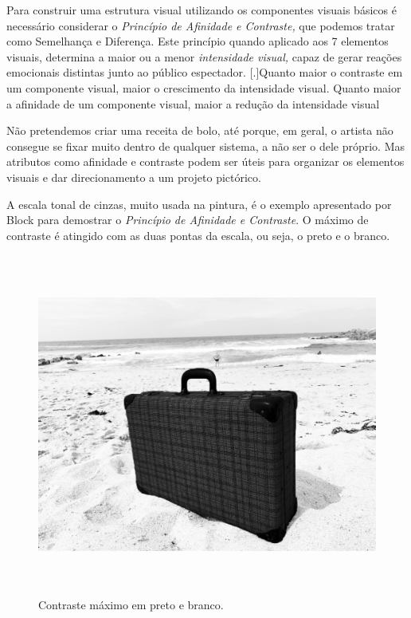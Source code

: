 Para construir uma estrutura visual utilizando os componentes visuais
básicos é necessário considerar o \emph{Princípio de Afinidade e
	Contraste,} que podemos tratar como Semelhança e Diferença. Este
princípio quando aplicado aos 7 elementos visuais, determina a maior ou
a menor \emph{intensidade visual,} capaz de gerar reações emocionais
distintas junto ao público espectador. [.]{Quanto maior o
	contraste em um componente visual, maior o crescimento da intensidade
	visual. Quanto maior a afinidade de um componente visual, maior a
	redução da intensidade visual}

Não pretendemos criar uma receita de bolo, até porque, em geral, o
artista não consegue se fixar muito dentro de qualquer sistema, a não
ser o dele próprio. Mas atributos como afinidade e contraste podem ser
úteis para organizar os elementos visuais e dar direcionamento a um
projeto pictórico.

A escala tonal de cinzas, muito usada na pintura, é o exemplo
apresentado por Block para demostrar o \emph{Princípio de Afinidade e
	Contraste}. O máximo de contraste é atingido com as duas pontas da
escala, ou seja, o preto e o branco.

\begin{figure}
	\caption{Contraste máximo em preto e branco.}
	\includegraphics[width=5.90139in,height=4.42639in]{figuras/contraste-maximo-preto-branco.pdf.compressed.pdf}
\end{figure}

